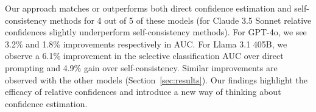 Our approach matches or outperforms both direct confidence estimation and self-consistency methods for 4 out of 5 of these models (for Claude 3.5 Sonnet relative confidences slightly underperform self-consistency methods). For GPT-4o, we see 3.2\% and 1.8\% improvements respectively in AUC. For Llama 3.1 405B, we observe a 6.1\% improvement in the selective classification AUC over direct prompting and 4.9\% gain over self-consistency. Similar improvements are observed with the other models (Section~\ref{sec:results}). Our findings highlight the efficacy of relative confidences and introduce a new way of thinking about confidence estimation. 
